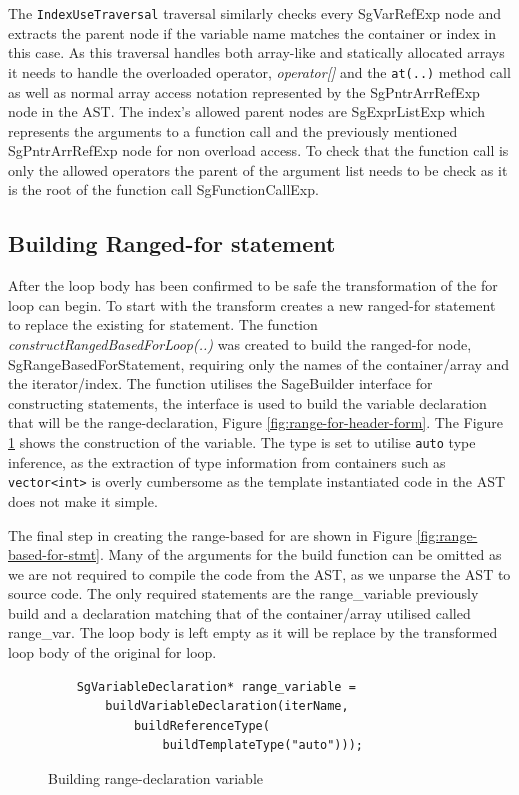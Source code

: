 \documentclass[bsc,frontabs,singlespacing,parskip,deptreport]{infthesis}
\begin{document}
The \texttt{IndexUseTraversal} traversal similarly checks every SgVarRefExp node and extracts the parent node if the variable name matches the container or index in this case. As this traversal handles both array-like and statically allocated arrays it needs to handle the overloaded operator, \textit{operator[]} and the \texttt{at(..)} method call as well as normal array access notation represented by the SgPntrArrRefExp node in the AST. The index's allowed parent nodes are SgExprListExp which represents the arguments to a function call and the previously mentioned SgPntrArrRefExp node for non overload access. To check that the function call is only the allowed operators the parent of the argument list needs to be check as it is the root of the function call SgFunctionCallExp.

\subsection{Building Ranged-for statement}\label{sec:build-range-for}
After the loop body has been confirmed to be safe the transformation of the for loop can begin. To start with the transform creates a new ranged-for statement to replace the existing for statement. The function \textit{constructRangedBasedForLoop(..)} was created to build the ranged-for node, SgRangeBasedForStatement, requiring only the names of the container/array and the iterator/index. The function utilises the SageBuilder interface for constructing statements, the interface is used to build the variable declaration that will be the range-declaration, Figure \ref{fig:range-for-header-form}. The Figure \ref{fig:range-dec-var} shows the construction of the variable. The type is set to utilise \texttt{auto} type inference, as the extraction of type information from containers such as \texttt{vector<int>} is overly cumbersome as the template instantiated code in the AST does not make it simple. 

The final step in creating the range-based for are shown in Figure \ref{fig:range-based-for-stmt}. Many of the arguments for the build function can be omitted as we are not required to compile the code from the AST, as we unparse the AST to source code. The only required statements are the range\_variable previously build and a declaration matching that of the container/array utilised called range\_var. The loop body is left empty as it will be replace by the transformed loop body of the original for loop.

\begin{figure}[H]
    \centering
    \begin{verbatim}
	SgVariableDeclaration* range_variable =
		buildVariableDeclaration(iterName, 
		    buildReferenceType(
		        buildTemplateType("auto"))); 
    \end{verbatim}
    \caption{Building range-declaration variable}
    \label{fig:range-dec-var}
\end{figure}
\end{document}
